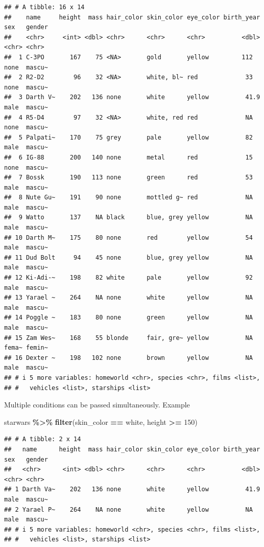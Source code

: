 \documentclass[
]{book}
\newenvironment{Shaded}{\begin{snugshade}}{\end{snugshade}}
\newcommand{\DecValTok}[1]{\textcolor[rgb]{0.00,0.00,0.81}{#1}}
\newcommand{\FunctionTok}[1]{\textcolor[rgb]{0.13,0.29,0.53}{\textbf{#1}}}
\newcommand{\NormalTok}[1]{#1}
\newcommand{\SpecialCharTok}[1]{\textcolor[rgb]{0.81,0.36,0.00}{\textbf{#1}}}
\newcommand{\StringTok}[1]{\textcolor[rgb]{0.31,0.60,0.02}{#1}}
\begin{document}
\begin{verbatim}
## # A tibble: 16 x 14
##    name     height  mass hair_color skin_color eye_color birth_year sex   gender
##    <chr>     <int> <dbl> <chr>      <chr>      <chr>          <dbl> <chr> <chr> 
##  1 C-3PO       167    75 <NA>       gold       yellow         112   none  mascu~
##  2 R2-D2        96    32 <NA>       white, bl~ red             33   none  mascu~
##  3 Darth V~    202   136 none       white      yellow          41.9 male  mascu~
##  4 R5-D4        97    32 <NA>       white, red red             NA   none  mascu~
##  5 Palpati~    170    75 grey       pale       yellow          82   male  mascu~
##  6 IG-88       200   140 none       metal      red             15   none  mascu~
##  7 Bossk       190   113 none       green      red             53   male  mascu~
##  8 Nute Gu~    191    90 none       mottled g~ red             NA   male  mascu~
##  9 Watto       137    NA black      blue, grey yellow          NA   male  mascu~
## 10 Darth M~    175    80 none       red        yellow          54   male  mascu~
## 11 Dud Bolt     94    45 none       blue, grey yellow          NA   male  mascu~
## 12 Ki-Adi-~    198    82 white      pale       yellow          92   male  mascu~
## 13 Yarael ~    264    NA none       white      yellow          NA   male  mascu~
## 14 Poggle ~    183    80 none       green      yellow          NA   male  mascu~
## 15 Zam Wes~    168    55 blonde     fair, gre~ yellow          NA   fema~ femin~
## 16 Dexter ~    198   102 none       brown      yellow          NA   male  mascu~
## # i 5 more variables: homeworld <chr>, species <chr>, films <list>,
## #   vehicles <list>, starships <list>
\end{verbatim}

Multiple conditions can be passed simultaneously. Example

\begin{Shaded}
\begin{Highlighting}[]
\NormalTok{starwars }\SpecialCharTok{\%\textgreater{}\%} 
  \FunctionTok{filter}\NormalTok{(skin\_color }\SpecialCharTok{==} \StringTok{\textquotesingle{}white\textquotesingle{}}\NormalTok{,}
\NormalTok{         height }\SpecialCharTok{\textgreater{}=} \DecValTok{150}\NormalTok{)}
\end{Highlighting}
\end{Shaded}

\begin{verbatim}
## # A tibble: 2 x 14
##   name      height  mass hair_color skin_color eye_color birth_year sex   gender
##   <chr>      <int> <dbl> <chr>      <chr>      <chr>          <dbl> <chr> <chr> 
## 1 Darth Va~    202   136 none       white      yellow          41.9 male  mascu~
## 2 Yarael P~    264    NA none       white      yellow          NA   male  mascu~
## # i 5 more variables: homeworld <chr>, species <chr>, films <list>,
## #   vehicles <list>, starships <list>
\end{verbatim}
\end{document}
